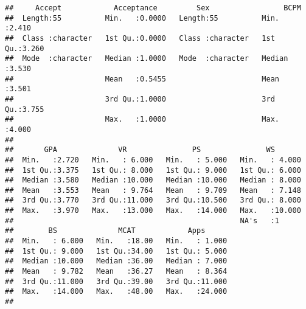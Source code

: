 \documentclass[
]{article}
\newenvironment{Shaded}{\begin{snugshade}}{\end{snugshade}}
\newcommand{\FunctionTok}[1]{\textcolor[rgb]{0.13,0.29,0.53}{\textbf{#1}}}
\newcommand{\NormalTok}[1]{#1}
\newcommand{\OtherTok}[1]{\textcolor[rgb]{0.56,0.35,0.01}{#1}}
\newcommand{\SpecialCharTok}[1]{\textcolor[rgb]{0.81,0.36,0.00}{\textbf{#1}}}
\newcommand{\StringTok}[1]{\textcolor[rgb]{0.31,0.60,0.02}{#1}}
\begin{document}
\begin{verbatim}
##     Accept            Acceptance         Sex                 BCPM      
##  Length:55          Min.   :0.0000   Length:55          Min.   :2.410  
##  Class :character   1st Qu.:0.0000   Class :character   1st Qu.:3.260  
##  Mode  :character   Median :1.0000   Mode  :character   Median :3.530  
##                     Mean   :0.5455                      Mean   :3.501  
##                     3rd Qu.:1.0000                      3rd Qu.:3.755  
##                     Max.   :1.0000                      Max.   :4.000  
##                                                                        
##       GPA              VR               PS               WS        
##  Min.   :2.720   Min.   : 6.000   Min.   : 5.000   Min.   : 4.000  
##  1st Qu.:3.375   1st Qu.: 8.000   1st Qu.: 9.000   1st Qu.: 6.000  
##  Median :3.580   Median :10.000   Median :10.000   Median : 8.000  
##  Mean   :3.553   Mean   : 9.764   Mean   : 9.709   Mean   : 7.148  
##  3rd Qu.:3.770   3rd Qu.:11.000   3rd Qu.:10.500   3rd Qu.: 8.000  
##  Max.   :3.970   Max.   :13.000   Max.   :14.000   Max.   :10.000  
##                                                    NA's   :1       
##        BS              MCAT            Apps       
##  Min.   : 6.000   Min.   :18.00   Min.   : 1.000  
##  1st Qu.: 9.000   1st Qu.:34.00   1st Qu.: 5.000  
##  Median :10.000   Median :36.00   Median : 7.000  
##  Mean   : 9.782   Mean   :36.27   Mean   : 8.364  
##  3rd Qu.:11.000   3rd Qu.:39.00   3rd Qu.:11.000  
##  Max.   :14.000   Max.   :48.00   Max.   :24.000  
## 
\end{verbatim}

\begin{Shaded}
\end{Shaded}
\end{document}
